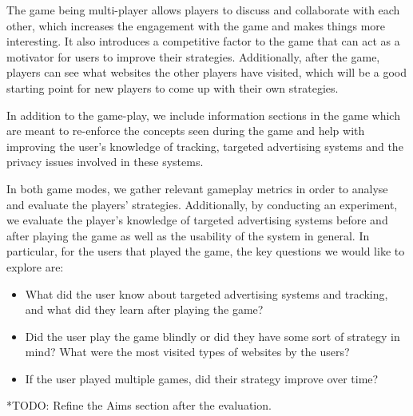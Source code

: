 \documentclass{l4proj}
\begin{document}
The game being multi-player allows players to discuss and collaborate with each other, which increases the engagement with the game and makes things more interesting. It also introduces a competitive factor to the game that can act as a motivator for users to improve their strategies.  Additionally, after the game, players can see what websites the other players have visited, which will be a good starting point for new players to come up with their own strategies.

In addition to the game-play, we include information sections in the game which are meant to re-enforce the concepts seen during the game and help with improving the user's knowledge of tracking, targeted advertising systems and the privacy issues involved in these systems.     

In both game modes, we gather relevant gameplay metrics in order to analyse and evaluate the players' strategies. Additionally, by conducting an experiment, we evaluate the player's knowledge of targeted advertising systems before and after playing the game as well as the usability of the system in general. In particular, for the users that played the game, the key questions we would like to explore are:
\begin{itemize}
    \item
    What did the user know about targeted advertising systems and tracking, and what did they learn after playing the game?
    \item
    Did the user play the game blindly or did they have some sort of strategy in mind? What were the most visited types of websites by the users?
    \item
    If the user played multiple games, did their strategy improve over time?
\end{itemize}

*TODO: Refine the Aims section after the evaluation. 
\end{document}
